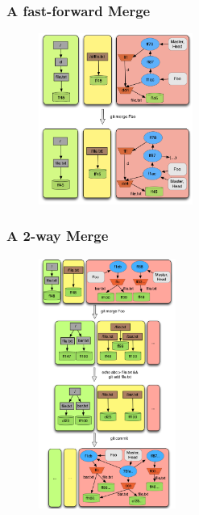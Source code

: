 \documentclass{beamer}
\begin{document}
\begin{frame}[fragile]
   \frametitle{ A fast-forward Merge}
   \begin{figure}
      \centering
      \includegraphics[width=0.45\textwidth]{images/fastforwardmerge.png}
   \end{figure}
\end{frame}

\begin{frame}[fragile]
   \frametitle{A 2-way Merge}
   \begin{figure}
      \centering
      \includegraphics[width=0.40\textwidth]{images/merge2way.png}
   \end{figure}
\end{frame}
\end{document}
